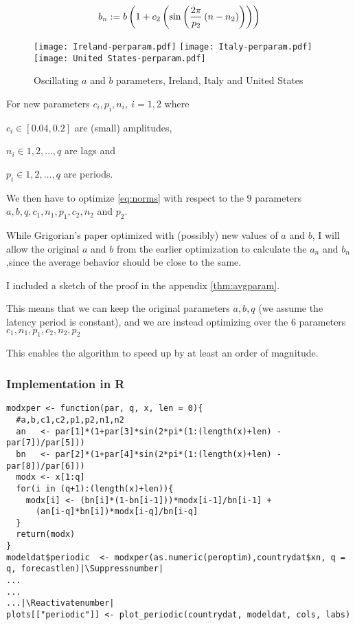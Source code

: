 \begin{equation} \label{eq:bnper}
b_n := b\left(1+c_2\left(\sin\left(\frac{2\pi}{p_2}\left(n-n_2\right)\right)\right)\right)
\end{equation}

\begin{figure}[H]
  \texttt{[image: Ireland-perparam.pdf]} \label{fig:ireland-perparam}
\endminipage\hfill
{}
  \texttt{[image: Italy-perparam.pdf]} \label{fig:italy-perparam}
\endminipage\hfill
{}
  \texttt{[image: United States-perparam.pdf]} \label{fig:usa-perparam}
\endminipage\hfill
\caption{Oscillating $a$ and $b$ parameters, Ireland, Italy and United States}
\end{figure}

For new parameters $c_i,p_i,n_i, \ i=1,2$ where

$c_i  \in [0.04, 0.2]$ \quad are (small) amplitudes,

$n_i  \in 1,2,\dots,q$ \quad  are lags and

$p_i  \in 1,2,\dots,q$ \quad are periods.

We then have to optimize \eqref{eq:norms} with respect to the $9$ parameters $a,b,q,c_1,n_1,p_1,c_2,n_2$ and $p_2$.

While Grigorian's paper \cite{grigor20} optimized with (possibly) new values of $a$ and $b$, I will allow the original $a$ and $b$ from the earlier optimization to calculate the $a_n$ and $b_n$,since the average behavior should be close to the same. 

I included a sketch of the proof in the appendix \ref{thm:avgparam}.

This means that we can keep the original parameters $a,b,q$ (we assume the latency period is constant), and we are instead optimizing over the $6$ parameters $c_1,n_1,p_1,c_2,n_2,p_2$

This enables the algorithm to speed up by at least an order of magnitude.

\subsubsection{Implementation in R}

\begin{lstlisting}[breaklines = true, escapeinside=||, tabsize = 4, frame=single, caption = {Algorithm for Periodic Model}]
modxper <- function(par, q, x, len = 0){
  #a,b,c1,c2,p1,p2,n1,n2
  an   <- par[1]*(1+par[3]*sin(2*pi*(1:(length(x)+len) - par[7])/par[5]))
  bn   <- par[2]*(1+par[4]*sin(2*pi*(1:(length(x)+len) - par[8])/par[6]))
  modx <- x[1:q]
  for(i in (q+1):(length(x)+len)){
    modx[i] <- (bn[i]*(1-bn[i-1]))*modx[i-1]/bn[i-1] +
      (an[i-q]*bn[i])*modx[i-q]/bn[i-q]
  }
  return(modx)
}
modeldat$periodic  <- modxper(as.numeric(peroptim),countrydat$xn, q = q, forecastlen)|\Suppressnumber|
...
...
...|\Reactivatenumber|
plots[["periodic"]] <- plot_periodic(countrydat, modeldat, cols, labs)
\end{lstlisting}

